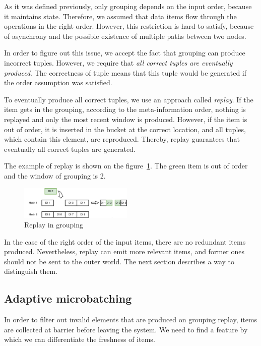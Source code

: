 \label {fs-collision}

As it was defined previously, only grouping depends on the input order, because it maintains state. Therefore, we assumed that data items flow through the operations in the right order. However, this restriction is hard to satisfy, because of asynchrony and the possible existence of multiple paths between two nodes.

In order to figure out this issue, we accept the fact that grouping can produce incorrect tuples. However, we require that {\it all correct tuples are eventually produced}. The correctness of tuple means that this tuple would be generated if the order assumption was satisfied. 

To eventually produce all correct tuples, we use an approach called {\it replay}. If the item gets in the grouping, according to the meta-information order, nothing is replayed and only the most recent window is produced. However, if the item is out of order, it is inserted in the bucket at the correct location, and all tuples, which contain this element, are reproduced. Thereby, replay guarantees that eventually all correct tuples are generated.

The example of replay is shown on the figure~\ref{grouping-replaying-figure}. The green item is out of order and the window of grouping is 2.

\begin{figure}[htbp]
  \centering
  \includegraphics[width=0.48\textwidth]{pics/grouping-replaying}
  \caption{Replay in grouping}
  \label {grouping-replaying-figure}
\end{figure}

In the case of the right order of the input items, there are no redundant items produced. Nevertheless, replay can emit more relevant items, and former ones should not be sent to the outer world. The next section describes a way to distinguish them.

\subsection{Adaptive microbatching}
In order to filter out invalid elements that are produced on grouping replay, items are collected at barrier before leaving the system. We need to find a feature by which we can differentiate the freshness of items.

